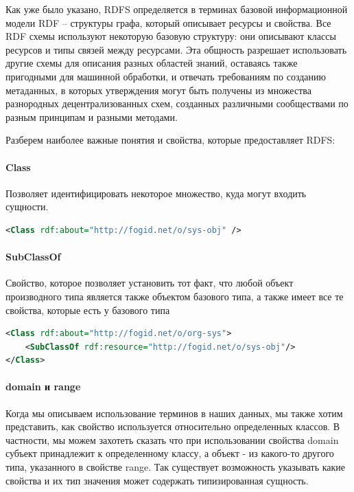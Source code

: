 \documentclass[12pt]{article}
\begin{document}
Как уже было указано, RDFS определяется в терминах базовой информационной модели RDF – структуры графа, который описывает ресурсы и свойства. Все RDF схемы используют некоторую базовую структуру: они описывают классы ресурсов и типы связей между ресурсами. Эта общность разрешает использовать другие схемы для описания разных областей знаний, оставаясь также пригодными для машинной обработки, и отвечать требованиям по созданию метаданных, в которых утверждения могут быть получены из множества разнородных децентрализованных схем, созданных различными сообществами по разным принципам и разными методами.\par

Разберем наиболее важные понятия и свойства, которые предоставляет RDFS:

\paragraph{Class}
Позволяет идентифицировать некоторое множество, куда могут входить сущности.

\begin{lstlisting}[language=XML]
<Class rdf:about="http://fogid.net/o/sys-obj" />
\end{lstlisting}

\paragraph{SubClassOf}
Свойство, которое позволяет установить тот факт, что любой объект производного типа является также объектом базового типа, а также имеет все те свойства, которые есть у базового типа

\begin{lstlisting}[language=XML]
<Class rdf:about="http://fogid.net/o/org-sys">
    <SubClassOf rdf:resource="http://fogid.net/o/sys-obj"/>
</Class>
\end{lstlisting}

\paragraph{domain и range}
Когда мы описываем использование терминов в наших данных, мы также хотим представить, как свойство используется относительно определенных классов. В частности, мы можем захотеть сказать что при использовании свойства domain субъект принадлежит к определенному классу, а объект - из какого-то другого типа, указанного в свойстве range. Так существует возможность указывать какие свойства и их тип значения может содержать типизированная сущность.
\end{document}
